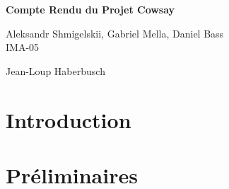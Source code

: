 \documentclass[a4paper,french,11pt]{article}
\begin{document}
\thispagestyle{empty}
\begin{center}

\vspace{10ex}
\huge\sffamily\textbf{Compte Rendu du Projet Cowsay}

\vspace{3ex}
\large


\vspace{3ex}
Aleksandr Shmigelskii, Gabriel Mella, Daniel Bass \\ IMA-05
\end{center}
\vspace{2ex}
{\sffamily \large}

\vspace{.5ex}
 Jean-Loup Haberbusch

\vspace{.5ex}
\tableofcontents  
\vspace{2ex}

\newpage
\section{Introduction}

\newpage
\section{Préliminaires}
\end{document}
